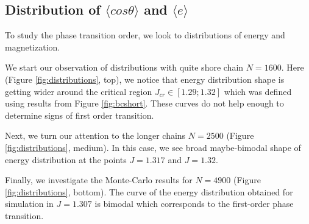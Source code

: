 \subsection{Distribution of $\langle cos \theta \rangle$ and $\langle e \rangle$ } \label{sec:distributions}
To study the phase transition order, we look to distributions of energy and magnetization.

We start our observation of distributions with quite shore chain $N=1600$. Here (Figure \ref{fig:distributions}, top), we notice that energy distribution shape is getting wider around the critical region $J_{cr} \in [1.29; 1.32]$ which was defined using results from Figure \ref{fig:bcshort}. These curves  do not help enough to determine signs of first order transition. 

Next, we turn our attention to the longer chains $N=2500$ (Figure \ref{fig:distributions}, medium). In this case, we see broad maybe-bimodal shape of energy distribution at the points $J=1.317$ and $J=1.32$.  

Finally, we investigate the Monte-Carlo results for $N=4900$ (Figure \ref{fig:distributions}, bottom). The curve of the energy distribution obtained for simulation in $J=1.307$ is bimodal which corresponds to the first-order phase transition.   

